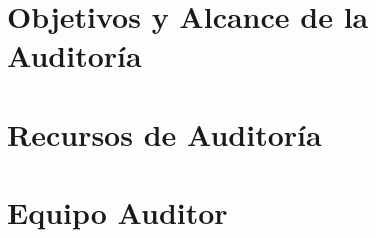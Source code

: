 \section{Objetivos y Alcance de la Auditoría}

\section{Recursos de Auditoría}

\section{Equipo Auditor}
